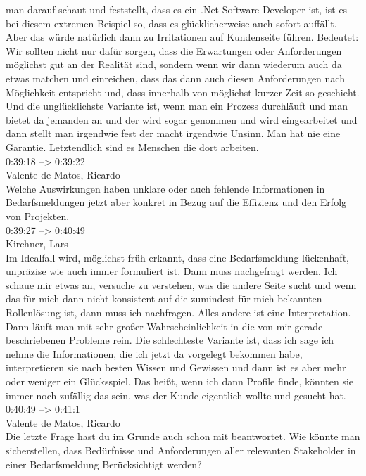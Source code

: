 man darauf schaut und feststellt, dass es ein .Net Software Developer ist, ist es bei diesem extremen Beispiel so, dass es glücklicherweise auch sofort auffällt. Aber das würde natürlich dann zu Irritationen auf Kundenseite führen. Bedeutet: Wir sollten nicht nur dafür sorgen, dass die Erwartungen oder Anforderungen möglichst gut an der Realität sind, sondern wenn wir dann wiederum auch da etwas matchen und einreichen, dass das dann auch diesen Anforderungen nach Möglichkeit entspricht und, dass innerhalb von möglichst kurzer Zeit so geschieht. Und die unglücklichste Variante ist, wenn man ein Prozess durchläuft und man bietet da jemanden an und der wird sogar genommen und wird eingearbeitet und dann stellt man irgendwie fest der macht irgendwie Unsinn. Man hat nie eine Garantie. Letztendlich sind es Menschen die dort arbeiten.\\

0:39:18 --> 0:39:22\\
Valente de Matos, Ricardo\\
Welche Auswirkungen haben unklare oder auch fehlende Informationen in Bedarfsmeldungen jetzt aber konkret in Bezug auf die Effizienz und den Erfolg von Projekten.\\

0:39:27 --> 0:40:49\\
Kirchner, Lars\\
Im Idealfall wird, möglichst früh erkannt, dass eine Bedarfsmeldung lückenhaft, unpräzise wie auch immer formuliert ist. Dann muss nachgefragt werden. Ich schaue mir etwas an, versuche zu verstehen, was die andere Seite sucht und wenn das für mich dann nicht konsistent auf die zumindest für mich bekannten Rollenlösung ist, dann muss ich nachfragen. Alles andere ist eine Interpretation. Dann läuft man mit sehr großer Wahrscheinlichkeit in die von mir gerade beschriebenen Probleme rein. Die schlechteste Variante ist, dass ich sage ich nehme die Informationen, die ich jetzt da vorgelegt bekommen habe, interpretieren sie nach besten Wissen und Gewissen und dann ist es aber mehr oder weniger ein Glücksspiel. Das heißt, wenn ich dann Profile finde, könnten sie immer noch zufällig das sein, was der Kunde eigentlich wollte und gesucht hat.\\

0:40:49 --> 0:41:1\\
Valente de Matos, Ricardo\\
Die letzte Frage hast du im Grunde auch schon mit beantwortet. Wie könnte man sicherstellen, dass Bedürfnisse und Anforderungen aller relevanten Stakeholder in einer Bedarfsmeldung Berücksichtigt werden?\\

